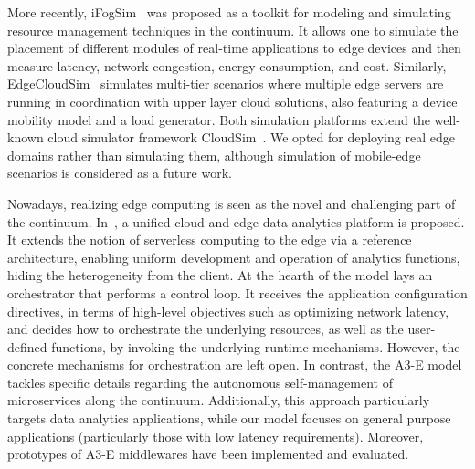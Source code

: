 More recently, iFogSim~\cite{GuptaIfogSim17} was proposed as a toolkit for modeling and simulating resource management techniques in the continuum. It allows one to simulate the placement of different modules of real-time applications to edge devices and then measure latency, network congestion, energy consumption, and cost. Similarly, EdgeCloudSim~\cite{SonmezEgdeCloudSim17} simulates multi-tier scenarios where multiple edge servers are running in coordination with upper layer cloud solutions, also featuring a device mobility model and a load generator. Both simulation platforms extend the well-known cloud simulator framework CloudSim~\cite{calheiros2011cloudsim}. We opted for deploying real edge domains rather than simulating them, although simulation of mobile-edge scenarios is considered as a future work.

Nowadays, realizing edge computing is seen as the novel and challenging part of the continuum. In~\cite{Nastic17ServerlessDataAnalytics}, a unified cloud and edge data analytics platform is proposed. It extends the notion of serverless computing to the edge via a reference architecture, enabling uniform development and operation of analytics functions, hiding the heterogeneity from the client. At the hearth of the model lays an orchestrator that performs a control loop. It receives the application configuration directives, in terms of high-level objectives such as optimizing network latency, and decides how to orchestrate the underlying resources, as well as the user-defined functions, by invoking
the underlying runtime mechanisms. However, the concrete mechanisms for orchestration are left open. In contrast, the A3-E model tackles specific details regarding the autonomous self-management of  microservices along the continuum. Additionally, this approach particularly targets data analytics applications, while our model focuses on general purpose applications (particularly those with low latency requirements). Moreover, prototypes of A3-E middlewares have been implemented and evaluated. 


